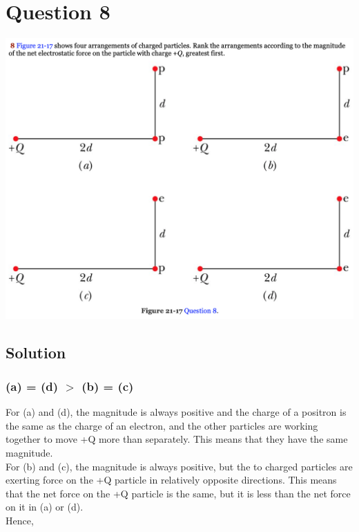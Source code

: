 \documentclass[12pt]{article}
\begin{document}
\section*{Question 8}
    \includegraphics[width=\textwidth]{picture_2.png} 

\subsection*{Solution}
\subsubsection{(a) = (d) $>$ (b) = (c)}
For (a) and (d), the magnitude is always positive and the charge of a positron is the same as the charge of an electron, and the other particles are working together to move +Q more than separately. This means that they have the same magnitude.\\
For (b) and (c), the magnitude is always positive, but the to charged particles are exerting force on the +Q particle in relatively opposite directions. This means that the net force on the +Q particle is the same, but it is less than the net force on it in (a) or (d).\\
Hence, 


\pagebreak
\end{document}
